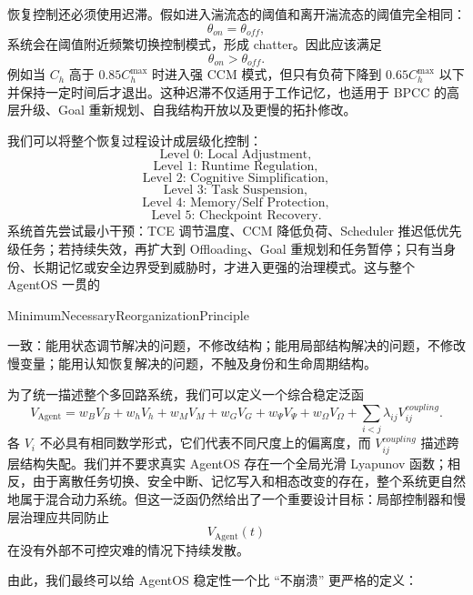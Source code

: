 恢复控制还必须使用迟滞。假如进入湍流态的阈值和离开湍流态的阈值完全相同：
\[
\theta_{on}=\theta_{off},
\]
系统会在阈值附近频繁切换控制模式，形成 chatter。因此应该满足
\[
\boxed{
\theta_{on}>\theta_{off}.
}
\]
例如当 $C_h$ 高于 $0.85C_h^{\max}$ 时进入强 CCM 模式，但只有负荷下降到 $0.65C_h^{\max}$ 以下并保持一定时间后才退出。这种迟滞不仅适用于工作记忆，也适用于 BPCC 的高层升级、Goal 重新规划、自我结构开放以及更慢的拓扑修改。

我们可以将整个恢复过程设计成层级化控制：
\[
\text{Level 0: Local Adjustment},
\]
\[
\text{Level 1: Runtime Regulation},
\]
\[
\text{Level 2: Cognitive Simplification},
\]
\[
\text{Level 3: Task Suspension},
\]
\[
\text{Level 4: Memory/Self Protection},
\]
\[
\text{Level 5: Checkpoint Recovery}.
\]
系统首先尝试最小干预：TCE 调节温度、CCM 降低负荷、Scheduler 推迟低优先级任务；若持续失效，再扩大到 Offloading、Goal 重规划和任务暂停；只有当身份、长期记忆或安全边界受到威胁时，才进入更强的治理模式。这与整个 AgentOS 一贯的
\begin{statementbox}
MinimumNecessaryReorganizationPrinciple
\end{statementbox}
一致：能用状态调节解决的问题，不修改结构；能用局部结构解决的问题，不修改慢变量；能用认知恢复解决的问题，不触及身份和生命周期结构。

为了统一描述整个多回路系统，我们可以定义一个综合稳定泛函
\[
V_{\mathrm{Agent}}
=
w_BV_B
+
w_hV_h
+
w_MV_M
+
w_GV_G
+
w_\Psi V_\Psi
+
w_\Omega V_\Omega
+
\sum_{i<j}
\lambda_{ij}V_{ij}^{coupling}.
\]
各 $V_i$ 不必具有相同数学形式，它们代表不同尺度上的偏离度，而 $V_{ij}^{coupling}$ 描述跨层结构失配。我们并不要求真实 AgentOS 存在一个全局光滑 Lyapunov 函数；相反，由于离散任务切换、安全中断、记忆写入和相态改变的存在，整个系统更自然地属于混合动力系统。但这一泛函仍然给出了一个重要设计目标：局部控制器和慢层治理应共同防止
\[
V_{\mathrm{Agent}}(t)
\]
在没有外部不可控灾难的情况下持续发散。

由此，我们最终可以给 AgentOS 稳定性一个比 ``不崩溃'' 更严格的定义：
\begin{statementbox}
\centering
{}
\end{statementbox}

